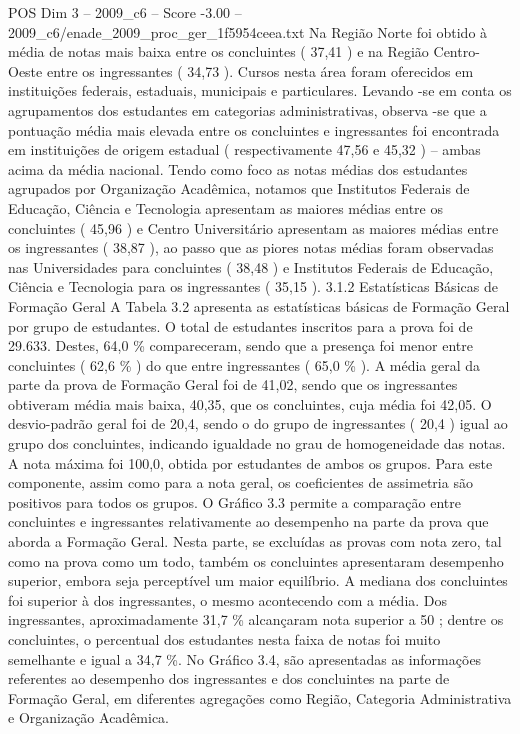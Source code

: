 \begin{textsample}{POS Dim 3 – 2009\_c6 – Score -3.00 – 2009\_c6/enade\_2009\_proc\_ger\_1f5954ceea.txt}
Na Região Norte foi obtido à média de notas mais baixa entre os concluintes ( 37,41 ) e na Região Centro-Oeste entre os ingressantes ( 34,73 ).
Cursos nesta área foram oferecidos em instituições federais, estaduais, municipais e particulares.
Levando -se em conta os agrupamentos dos estudantes em categorias administrativas, observa -se que a pontuação média mais elevada entre os concluintes e ingressantes foi encontrada em instituições de origem estadual ( respectivamente 47,56 e 45,32 ) – ambas acima da média nacional.
Tendo como foco as notas médias dos estudantes agrupados por Organização Acadêmica, notamos que Institutos Federais de Educação, Ciência e Tecnologia apresentam as maiores médias entre os concluintes ( 45,96 ) e Centro Universitário apresentam as maiores médias entre os ingressantes ( 38,87 ), ao passo que as piores notas médias foram observadas nas Universidades para concluintes ( 38,48 ) e Institutos Federais de Educação, Ciência e Tecnologia para os ingressantes ( 35,15 ). 3.1.2 Estatísticas Básicas de Formação Geral A Tabela 3.2 apresenta as estatísticas básicas de Formação Geral por grupo de estudantes.
O total de estudantes inscritos para a prova foi de 29.633.
Destes, 64,0 \% compareceram, sendo que a presença foi menor entre concluintes ( 62,6 \% ) do que entre ingressantes ( 65,0 \% ).
A média geral da parte da prova de Formação Geral foi de 41,02, sendo que os ingressantes obtiveram média mais baixa, 40,35, que os concluintes, cuja média foi 42,05.
O desvio-padrão geral foi de 20,4, sendo o do grupo de ingressantes ( 20,4 ) igual ao grupo dos concluintes, indicando igualdade no grau de homogeneidade das notas.
A nota máxima foi 100,0, obtida por estudantes de ambos os grupos.
Para este componente, assim como para a nota geral, os coeficientes de assimetria são positivos para todos os grupos.
O Gráfico 3.3 permite a comparação entre concluintes e ingressantes relativamente ao desempenho na parte da prova que aborda a Formação Geral.
Nesta parte, se excluídas as provas com nota zero, tal como na prova como um todo, também os concluintes apresentaram desempenho superior, embora seja perceptível um maior equilíbrio.
A mediana dos concluintes foi superior à dos ingressantes, o mesmo acontecendo com a média.
Dos ingressantes, aproximadamente 31,7 \% alcançaram nota superior a 50 ; dentre os concluintes, o percentual dos estudantes nesta faixa de notas foi muito semelhante e igual a 34,7 \%.
No Gráfico 3.4, são apresentadas as informações referentes ao desempenho dos ingressantes e dos concluintes na parte de Formação Geral, em diferentes agregações como Região, Categoria Administrativa e Organização Acadêmica.

\end{textsample}
